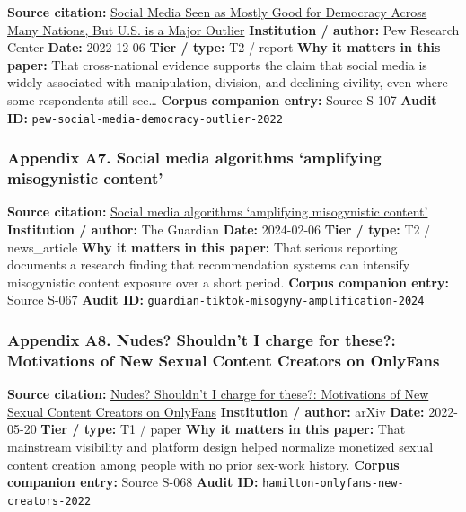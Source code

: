 \documentclass[
  american,
  11pt,
  letterpaper,
]{article}
\begin{document}
\textbf{Source citation:}
\href{https://www.pewresearch.org/global/2022/12/06/social-media-seen-as-mostly-good-for-democracy-across-many-nations-but-u-s-is-a-major-outlier/}{Social
Media Seen as Mostly Good for Democracy Across Many Nations, But U.S. is
a Major Outlier} \textbf{Institution / author:} Pew Research Center
\textbf{Date:} 2022-12-06 \textbf{Tier / type:} T2 / report \textbf{Why
it matters in this paper:} That cross-national evidence supports the
claim that social media is widely associated with manipulation,
division, and declining civility, even where some respondents still
see\ldots{} \textbf{Corpus companion entry:} Source S-107 \textbf{Audit
ID:} \texttt{pew-social-media-democracy-outlier-2022}

\subsubsection{Appendix A7. Social media algorithms `amplifying
misogynistic
content'}\label{ch-02-appendix-a7-social-media-algorithms-amplifying-misogynistic-content}

\textbf{Source citation:}
\href{https://www.theguardian.com/media/2024/feb/06/social-media-algorithms-amplifying-misogynistic-content}{Social
media algorithms `amplifying misogynistic content'} \textbf{Institution
/ author:} The Guardian \textbf{Date:} 2024-02-06 \textbf{Tier / type:}
T2 / news\_article \textbf{Why it matters in this paper:} That serious
reporting documents a research finding that recommendation systems can
intensify misogynistic content exposure over a short period.
\textbf{Corpus companion entry:} Source S-067 \textbf{Audit ID:}
\texttt{guardian-tiktok-misogyny-amplification-2024}

\subsubsection{Appendix A8. Nudes? Shouldn't I charge for these?:
Motivations of New Sexual Content Creators on
OnlyFans}\label{ch-02-appendix-a8-nudes-shouldn-t-i-charge-for-these-motivations-of-new-sexual-content-creators-on-onlyfans}

\textbf{Source citation:} \href{https://arxiv.org/abs/2205.10425}{Nudes?
Shouldn't I charge for these?: Motivations of New Sexual Content
Creators on OnlyFans} \textbf{Institution / author:} arXiv
\textbf{Date:} 2022-05-20 \textbf{Tier / type:} T1 / paper \textbf{Why
it matters in this paper:} That mainstream visibility and platform
design helped normalize monetized sexual content creation among people
with no prior sex-work history. \textbf{Corpus companion entry:} Source
S-068 \textbf{Audit ID:} \texttt{hamilton-onlyfans-new-creators-2022}
\end{document}

